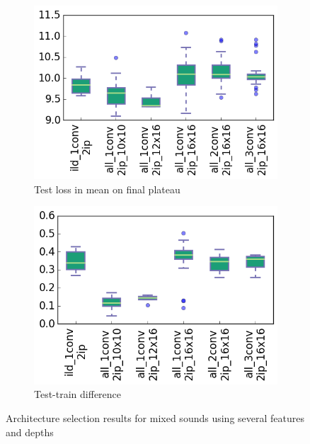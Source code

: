 \begin{figure}[htb]
\begin{subfigure}[t]{0.5\textwidth}
	\centering
	\includegraphics[scale=0.5]{images-architecture-mixed/mean_test_loss}
    \caption{Test loss in mean on final plateau}
	\label{fig:results:mean_test_loss_mixed}
\end{subfigure}%
\begin{subfigure}[t]{0.5\textwidth}
	\centering
	\includegraphics[scale=0.5]{images-architecture-mixed/test_train_diff}
    \caption{Test-train difference}
	\label{fig:results:test_train_diff_mixed}
\end{subfigure}
\caption{Architecture selection results for mixed sounds using several features and depths}
\end{figure}
